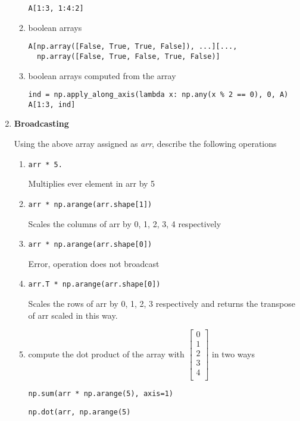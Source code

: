 \documentclass{article}
\newcounter{points}
\newcommand\printpoints{Total number of points: \thepoints}
\begin{document}
\begin{enumerate}
\begin{enumerate}
\texttt{A[1:3, 1:4:2]}

\item boolean arrays
\begin{verbatim}
A[np.array([False, True, True, False]), ...][...,
  np.array([False, True, False, True, False)]
\end{verbatim}


\item boolean arrays computed from the array


\begin{verbatim}
ind = np.apply_along_axis(lambda x: np.any(x % 2 == 0), 0, A)
A[1:3, ind]
\end{verbatim}
\end{enumerate}


\item \textbf{Broadcasting}

Using the above array assigned as \textit{arr}, describe the following operations


\begin{enumerate}


\item 
\begin{verbatim}
arr * 5.
\end{verbatim}
Multiplies ever element in arr by 5

\item 
\begin{verbatim}
arr * np.arange(arr.shape[1])
\end{verbatim}

Scales the columns of arr by 0, 1, 2, 3, 4
respectively\item 
\begin{verbatim}
arr * np.arange(arr.shape[0])
\end{verbatim}

Error, operation does not broadcast
\item 
\begin{verbatim}
arr.T * np.arange(arr.shape[0])
\end{verbatim}
Scales the rows of arr by 0, 1, 2, 3 respectively and returns the transpose of arr scaled in this way.

\item compute the dot product of the array with $\begin{bmatrix}
0\\
1\\
2\\
3\\
4\\
\end{bmatrix}$
in two ways

\texttt{np.sum(arr * np.arange(5), axis=1)}

\texttt{np.dot(arr, np.arange(5)}
\end{enumerate}

\end{enumerate}
\end{document}
